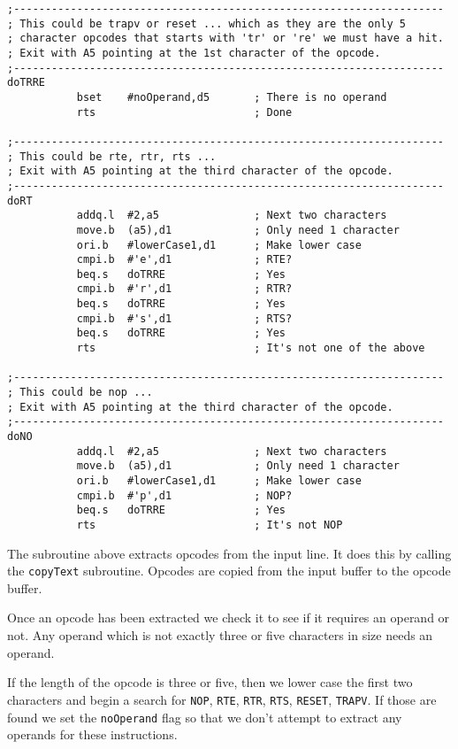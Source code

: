\begin{lstlisting}[firstnumber=last,caption={ASMReformat Source - Extracting Opcodes}]
;--------------------------------------------------------------------
; This could be trapv or reset ... which as they are the only 5 
; character opcodes that starts with 'tr' or 're' we must have a hit.
; Exit with A5 pointing at the 1st character of the opcode.
;--------------------------------------------------------------------
doTRRE
           bset    #noOperand,d5       ; There is no operand
           rts                         ; Done

;--------------------------------------------------------------------
; This could be rte, rtr, rts ...
; Exit with A5 pointing at the third character of the opcode.
;--------------------------------------------------------------------
doRT
           addq.l  #2,a5               ; Next two characters
           move.b  (a5),d1             ; Only need 1 character
           ori.b   #lowerCase1,d1      ; Make lower case
           cmpi.b  #'e',d1             ; RTE?
           beq.s   doTRRE              ; Yes
           cmpi.b  #'r',d1             ; RTR?
           beq.s   doTRRE              ; Yes
           cmpi.b  #'s',d1             ; RTS?
           beq.s   doTRRE              ; Yes
           rts                         ; It's not one of the above

;--------------------------------------------------------------------
; This could be nop ...
; Exit with A5 pointing at the third character of the opcode.
;--------------------------------------------------------------------
doNO
           addq.l  #2,a5               ; Next two characters
           move.b  (a5),d1             ; Only need 1 character
           ori.b   #lowerCase1,d1      ; Make lower case
           cmpi.b  #'p',d1             ; NOP?
           beq.s   doTRRE              ; Yes
           rts                         ; It's not NOP           
\end{lstlisting}

The subroutine above extracts opcodes from the input line. It does this by calling the \texttt{copyText} subroutine. Opcodes are copied from the input buffer to the opcode buffer.

Once an opcode has been extracted we check it to see if it requires an operand or not. Any operand which is not exactly three or five characters in size needs an operand. 

If the length of the opcode is three or five, then we lower case the first two characters and begin a search for \texttt{NOP}, \texttt{RTE}, \texttt{RTR}, \texttt{RTS}, \texttt{RESET}, \texttt{TRAPV}. If those are found we set the \texttt{noOperand} flag so that we don't attempt to extract any operands for these instructions. 

